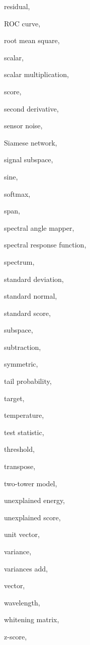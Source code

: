 \documentclass[11pt,a4paper,oneside,openany]{book}
\begin{document}
\begin{theindex}
  \item residual, 
  \item ROC curve, 
  \item root mean square, 
  \indexspace
  \item scalar, 
  \item scalar multiplication, 
  \item score, 
  \item second derivative, 
  \item sensor noise, 
  \item Siamese network, 
  \item signal subspace, 
  \item sine, 
  \item softmax, 
  \item span, 
  \item spectral angle mapper, 
  \item spectral response function, 
  \item spectrum, 
  \item standard deviation, 
  \item standard normal, 
  \item standard score, 
  \item subspace, 
  \item subtraction, 
  \item symmetric, 
  \indexspace
  \item tail probability, 
  \item target, 
  \item temperature, 
  \item test statistic, 
  \item threshold, 
  \item transpose, 
  \item two-tower model, 
  \indexspace
  \item unexplained energy, 
  \item unexplained score, 
  \item unit vector, 
  \indexspace
  \item variance, 
  \item variances add, 
  \item vector, 
  \indexspace
  \item wavelength, 
  \item whitening matrix, 
  \indexspace
  \item z-score, 
\end{theindex}
\end{document}
